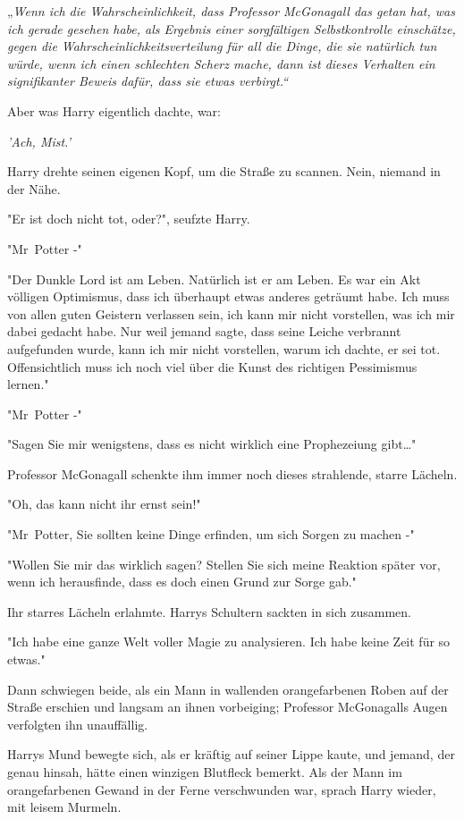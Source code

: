 {„\emph{Wenn ich die Wahrscheinlichkeit, dass Professor McGonagall das getan hat, was ich gerade gesehen habe, als Ergebnis einer sorgfältigen Selbstkontrolle einschätze, gegen die Wahrscheinlichkeitsverteilung für all die Dinge, die sie natürlich tun würde, wenn ich einen schlechten Scherz mache, dann ist dieses Verhalten ein signifikanter Beweis dafür, dass sie etwas verbirgt.“}

Aber was Harry eigentlich dachte, war:

\emph{'Ach, Mist.'}

Harry drehte seinen eigenen Kopf, um die Straße zu scannen. Nein, niemand in der Nähe.

"Er ist doch nicht tot, oder?", seufzte Harry.

"Mr~Potter -"

"Der Dunkle Lord ist am Leben. Natürlich ist er am Leben. Es war ein Akt völligen Optimismus, dass ich überhaupt etwas anderes geträumt habe. Ich muss von allen guten Geistern verlassen sein, ich kann mir nicht vorstellen, was ich mir dabei gedacht habe. Nur weil jemand sagte, dass seine Leiche verbrannt aufgefunden wurde, kann ich mir nicht vorstellen, warum ich dachte, er sei tot. Offensichtlich muss ich noch viel über die Kunst des richtigen Pessimismus lernen."

"Mr~Potter -"

"Sagen Sie mir wenigstens, dass es nicht wirklich eine Prophezeiung gibt…"

Professor McGonagall schenkte ihm immer noch dieses strahlende, starre Lächeln.

"Oh, das kann nicht ihr ernst sein!"

"Mr~Potter, Sie sollten keine Dinge erfinden, um sich Sorgen zu machen -"

"Wollen Sie mir das wirklich sagen? Stellen Sie sich meine Reaktion später vor, wenn ich herausfinde, dass es doch einen Grund zur Sorge gab."

Ihr starres Lächeln erlahmte. Harrys Schultern sackten in sich zusammen.

"Ich habe eine ganze Welt voller Magie zu analysieren. Ich habe keine Zeit für so etwas."

Dann schwiegen beide, als ein Mann in wallenden orangefarbenen Roben auf der Straße erschien und langsam an ihnen vorbeiging; Professor McGonagalls Augen verfolgten ihn unauffällig.

Harrys Mund bewegte sich, als er kräftig auf seiner Lippe kaute, und jemand, der genau hinsah, hätte einen winzigen Blutfleck bemerkt. Als der Mann im orangefarbenen Gewand in der Ferne verschwunden war, sprach Harry wieder, mit leisem Murmeln.

}
